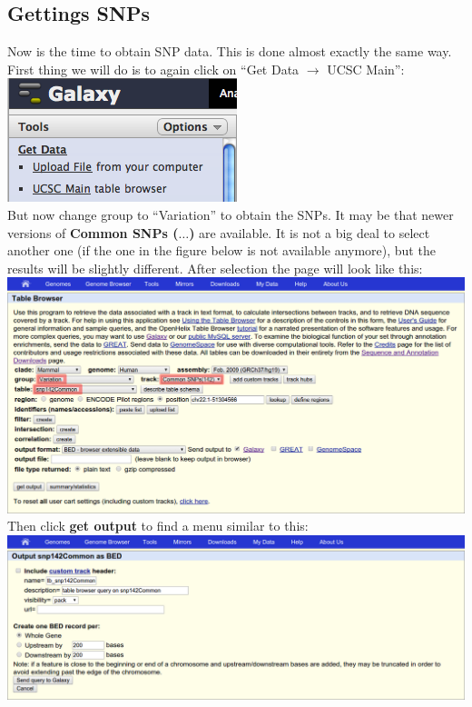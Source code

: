 \documentclass[11pt,a4paper]{article}
\begin{document}
\subsection{Gettings SNPs}
Now is the time to obtain SNP data. This is done almost exactly the same way. First thing we will do is to again click on ``Get Data $\rightarrow$ UCSC Main'':\\
\includegraphics[scale=0.65]{figures/101_01}\\
But now change group to ``Variation'' to obtain the SNPs. It may be that newer versions of \textbf{Common SNPs ($\ldots$)} are available. It is not a big deal to select another one (if the one in the figure below is not available anymore), but the results will be slightly different. After selection the page will look like this:\\
\includegraphics[width=\textwidth]{figures/101_06}\\
Then click \textbf{get output} to find a menu similar to this:\\
\includegraphics[width=\textwidth]{figures/101_07}\\
\end{document}
